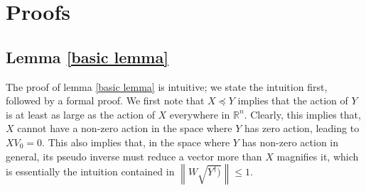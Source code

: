 \documentclass[11pt]{article}
\newcommand{\RR}{\mathbb{R}}
\newcommand{\norm}[1]{\left\|#1\right\|}
\newcommand{\Leq}{\preceq}
\begin{document}
\section{Proofs}
\subsection{Lemma \ref{basic lemma}}
The proof of lemma \ref{basic lemma} is intuitive; we state the intuition first, followed by a formal proof. We first note that $X \Leq Y$ implies that the action of $Y$ is at least as large as the action of $X$ everywhere in $\RR^n$. Clearly, this implies that, $X$ cannot have a non-zero action in the space where $Y$ has zero action, leading to $X V_0 = 0$. This also implies that, in the space where $Y$ has non-zero action in general, its pseudo inverse must reduce a vector more than $X$ magnifies it, which is essentially the intuition contained in $\norm{W \sqrt{Y^{\dagger})} } \leq 1$. 
\end{document}
